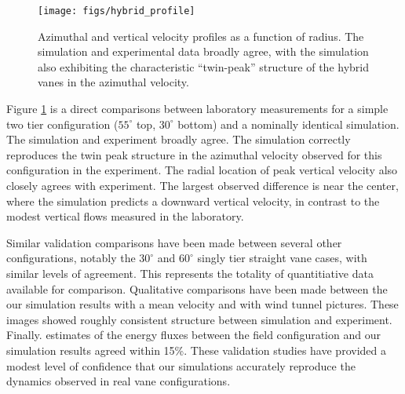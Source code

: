   \begin{figure}[!htb]
    \begin{center}
     \texttt{[image: figs/hybrid\_profile]}
     \caption{Azimuthal and vertical velocity profiles as a function of
     radius. The simulation and experimental data broadly agree, with
     the simulation also exhibiting the characteristic ``twin-peak''
     structure of the hybrid vanes in the azimuthal velocity. }
     \label{fig:lab}
    \end{center}
  \end{figure}

Figure \ref{fig:lab} is a direct comparisons between laboratory measurements for a simple 
two tier configuration ($55^{\circ}$ top, $30^{\circ}$ bottom) and 
a nominally identical simulation. The simulation and experiment broadly agree. The simulation 
correctly reproduces the twin peak structure in the azimuthal velocity 
observed for this configuration in the experiment. The radial location of peak vertical velocity also 
closely agrees with experiment. The largest observed difference is near the center, where the simulation predicts 
a downward vertical velocity, in contrast to the modest vertical flows measured in the laboratory. 

Similar validation comparisons have been made between several other configurations, notably the $30^{\circ}$ 
and $60^{\circ}$ singly tier straight vane cases, with similar levels of agreement. 
This represents the totality of quantitiative data available for comparison. Qualitative comparisons have been made
between the our simulation results with a mean velocity and with wind tunnel pictures. These images showed
roughly consistent structure between simulation and experiment. Finally. estimates of the energy fluxes between
the field configuration and our simulation results agreed within 15\%. These validation studies have provided a modest 
level of confidence that our simulations accurately reproduce the dynamics observed in real 
vane configurations.

%
% 
%
% 
%
%
%
%


%
%

